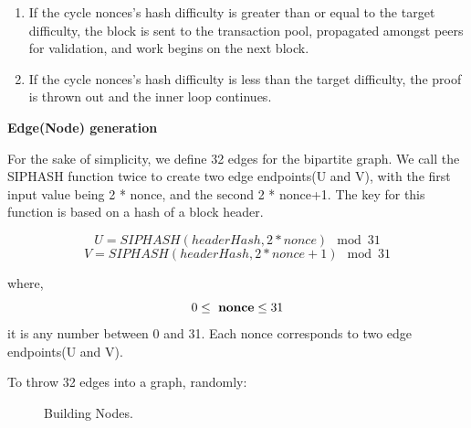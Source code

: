 \documentclass[a4paper,11pt]{article}
\begin{document}
\begin{enumerate}
\begin{enumerate}
\begin{enumerate}
			\item If the cycle nonces’s hash difficulty is greater than or equal to the target difficulty, the block is sent to the transaction pool, propagated amongst peers for validation, and work begins on the next block.
			\item If the cycle nonces’s hash difficulty is less than the target difficulty, the proof is thrown out and the inner loop continues.
		\end{enumerate}
		
\end{enumerate}

\end{enumerate}


\textbf{Edge(Node) generation}

For the sake of simplicity, we define 32 edges for the bipartite graph. We call the SIPHASH function twice to create two edge endpoints(U and V), with the first input value being 2 * nonce, and the second 2 * nonce+1. The key for this function is based on a hash of a block header.

\begin{equation}
{U = SIPHASH(headerHash, 2*nonce) \mod 31}
\end{equation}
\begin{equation}
{V = SIPHASH(headerHash, 2*nonce+1) \mod 31}
\end{equation}

where,
\begin{equation}
0\leq\ {\bf nonce} \leq 31
\end{equation}it is any number between 0 and 31. Each nonce corresponds to two edge endpoints(U and V).

To throw 32 edges into a graph, randomly:

\begin{figure}[h]
	\centerline{%
	}
	\caption{Building Nodes.}
\end{figure}
\end{document}
